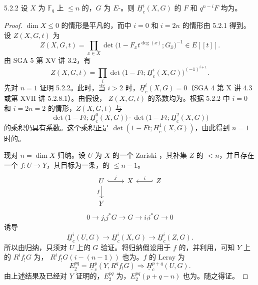 \begin{SGAresult}{}{5.2.2}
设 $X$ 为 $\mathbb F_q$ 上 $\leq n$ 的，$G$ 为 $E$-。则 $\underline H_c^i(X,G)$ 的 $F$ 和 $q^{n-i}F$ 均为。
\end{SGAresult}
\begin{proof}
$\dim X\leq0$ 的情形是平凡的，而中 $i=0$ 和 $i=2n$ 的情形由 5.2.1 得到。设 $Z(X,G,t)$ 为
\[
Z(X,G,t)=\prod_{x\in X}\det\bigl(1-F_xt^{\deg(x)};G_{\bar x}\bigr)^{-1}\in E[[t]].
\]
由 SGA 5 第 XV 讲 3.2，有
\[
Z(X,G,t)=\prod_i\det\bigl(1-Ft;\underline H_c^i(X,G)\bigr)^{(-1)^{i+1}}.
\tag{5.2.3}
\]
先对 $n=1$ 证明 5.2.2。此时，当 $i>2$ 时，$\underline H_c^i(X,G)=0$（SGA 4 第 X 讲 4.3 或第 XVII 讲 5.2.8.1）。由假设， $Z(X,G,t)$ 的系数均为。根据 5.2.2 中 $i=0$ 和 $i=2n=2$ 的情形，$Z(X,G,t)$ 与
\[
\det\bigl(1-Ft;\underline H_c^0(X,G)\bigr)\cdot
\det\bigl(1-Ft;\underline H_c^2(X,G)\bigr)
\]
的乘积仍具有系数。这个乘积正是 $\det(1-Ft;\underline H_c^1(X,G))$，由此得到 $n=1$ 时的。

现对 $n=\dim X$ 归纳。设 $U$ 为 $X$ 的一个 Zariski ，其补集 $Z$ 的 $<n$，并且存在一个 $f:U\to Y$，其目标为一条，的 $\leq n-1$。
\[
\begin{tikzcd}
U\arrow[r,hook,"j"]\arrow[d,"f"']&X&Z\arrow[l,hook',"i"']\\
Y&&
\end{tikzcd}
\]
\[
0\longrightarrow j_!j^*G\longrightarrow G\longrightarrow i_!i^*G\longrightarrow0
\]
诱导
\[
\underline H_c^i(U,G)\longrightarrow\underline H_c^i(X,G)\longrightarrow\underline H_c^i(Z,G).
\]
所以由归纳，只须对 $U$ 上的 $G$ 验证。将归纳假设用于 $f$ 的，并利用，可知 $Y$ 上的 $R^if_!G$ 为， $R^if_!G(i-(n-1))$ 也为。$f$ 的 Leray 为
\[
E_2^{pq}=\underline H_c^p(Y,R^qf_!G)\Longrightarrow\underline H_c^{p+q}(U,G).
\]
由上述结果及已经对 $Y$ 证明的，$E_2^{pq}$ 为，$E_2^{pq}(p+q-n)$ 也为。随之得证。
\end{proof}

